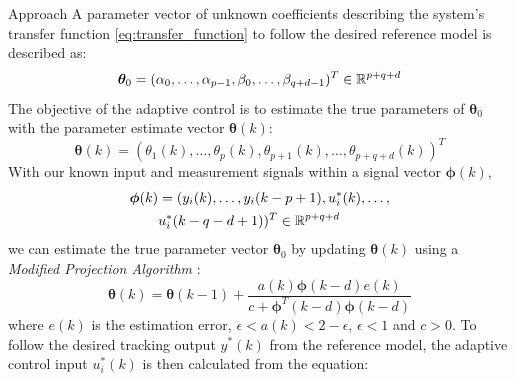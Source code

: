 \begin{section}{Approach}
A parameter vector of unknown coefficients describing the system's transfer function \eqref{eq:transfer_function} to follow the desired reference model is described as:
    \begin{equation}
	\bm{\theta}_0=(\alpha_0, \dots ,\alpha_{p-1},\beta_0, \dots ,\beta_{q+d-1})^T \in \mathbb{R}^{p+q+d}
	\end{equation}
The objective of the adaptive control is to estimate the true parameters of $\bm{\theta}_0$ with the parameter estimate vector $\bm{\theta}(k)$:
    \begin{equation}
    \bm{\theta}(k)=(\theta_1(k), \dots ,\theta_p(k),\theta_{p+1}(k), \dots ,\theta_{p+q+d}(k))^T
	\end{equation}
With our known input and measurement signals within a signal vector $\bm{\phi}(k)$,
	\begin{equation}
	\begin{split}
	\bm{\phi}(k)&=(y_i(k), \dots ,y_i(k-p+1),u^*_i(k), \dots , \\
	& u^*_i(k-q-d+1))^T \in \mathbb{R}^{p+q+d}
	\end{split}
	\end{equation}
we can estimate the true parameter vector $\bm{\theta}_0$ by updating $\bm{\theta}(k)$ using a \textit{Modified Projection Algorithm} \cite{tao2003adaptive}:
	\begin{equation}
	\label{eq:Modified_Proj_Algorithm}
	\bm{\theta}(k)=\bm{\theta}(k-1)+\frac{a(k)\bm{\phi}(k-d)e(k)}{c+\bm{\phi}^T(k-d)\bm{\phi}(k-d)}
	\end{equation}
where $e(k)$ is the estimation error, $\epsilon<a(k)<2-\epsilon$, $\epsilon<1$ and $c>0$. To follow the desired tracking output $y^*(k)$ from the reference model, the adaptive control input $u^*_i(k)$ is then calculated from the equation:

\end{section}
